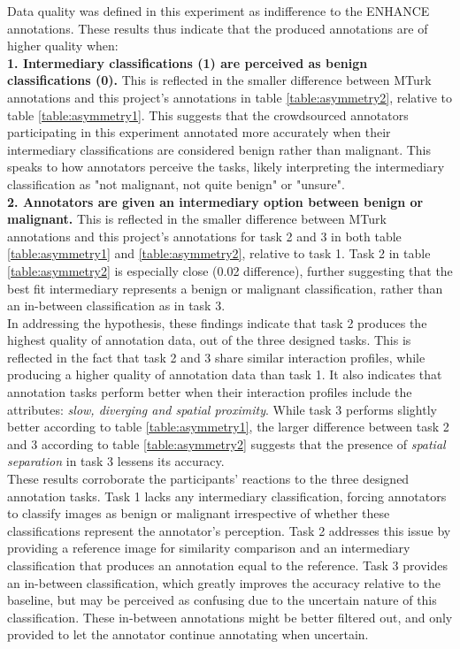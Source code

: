 \documentclass[../report.tex]{subfiles}
\begin{document}
\pagebreak

Data quality was defined in this experiment as indifference to the ENHANCE \cite{Ralf2021ENHANCE} annotations. These results thus indicate that the produced annotations are of higher quality when: \\

\textbf{1. Intermediary classifications (1) are perceived as benign classifications (0).} This is reflected in the smaller difference between MTurk annotations and this project's annotations in table \ref{table:asymmetry2}, relative to table \ref{table:asymmetry1}. This suggests that the crowdsourced annotators participating in this experiment annotated more accurately when their intermediary classifications are considered benign rather than malignant. This speaks to how annotators perceive the tasks, likely interpreting the intermediary classification as "not malignant, not quite benign" or "unsure". \\

\textbf{2. Annotators are given an intermediary option between benign or malignant.} This is reflected in the smaller difference between MTurk annotations and this project's annotations for task 2 and 3 in both table \ref{table:asymmetry1} and \ref{table:asymmetry2}, relative to task 1. Task 2 in table \ref{table:asymmetry2} is especially close (0.02 difference), further suggesting that the best fit intermediary represents a benign or malignant classification, rather than an in-between classification as in task 3. \\

In addressing the hypothesis, these findings indicate that task 2 produces the highest quality of annotation data, out of the three designed tasks. This is reflected in the fact that task 2 and 3 share similar interaction profiles, while producing a higher quality of annotation data than task 1. It also indicates that annotation tasks perform better when their interaction profiles include the attributes: \textit{slow, diverging and spatial proximity}. While task 3 performs slightly better according to table \ref{table:asymmetry1}, the larger difference between task 2 and 3 according to table \ref{table:asymmetry2} suggests that the presence of \textit{spatial separation} in task 3 lessens its accuracy. \\

These results corroborate the participants' reactions to the three designed annotation tasks. Task 1 lacks any intermediary classification, forcing annotators to classify images as benign or malignant irrespective of whether these classifications represent the annotator's perception. Task 2 addresses this issue by providing a reference image for similarity comparison and an intermediary classification that produces an annotation equal to the reference. Task 3 provides an in-between classification, which greatly improves the accuracy relative to the baseline, but may be perceived as confusing due to the uncertain nature of this classification. These in-between annotations might be better filtered out, and only provided to let the annotator continue annotating when uncertain.
\end{document}
